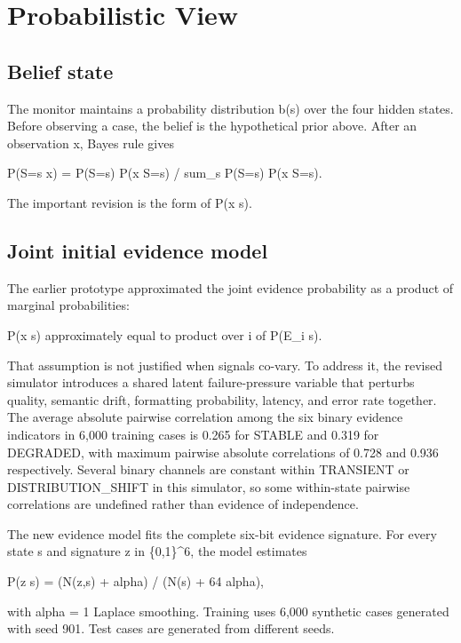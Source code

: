 \documentclass{article}
\begin{document}
\section{Probabilistic View}

\subsection{Belief state}

The monitor maintains a probability distribution b(s) over the four hidden states. Before observing a case, the belief is the hypothetical prior above. After an observation x, Bayes\textquotesingle{} rule gives

P(S=s \textbar{} x) = P(S=s) P(x \textbar{} S=s) / sum\_s\textquotesingle{} P(S=s\textquotesingle) P(x \textbar{} S=s\textquotesingle).

The important revision is the form of P(x \textbar{} s).

\subsection{Joint initial evidence model}

The earlier prototype approximated the joint evidence probability as a product of marginal probabilities:

P(x \textbar{} s) approximately equal to product over i of P(E\_i \textbar{} s).

That assumption is not justified when signals co-vary. To address it, the revised simulator introduces a shared latent failure-pressure variable that perturbs quality, semantic drift, formatting probability, latency, and error rate together. The average absolute pairwise correlation among the six binary evidence indicators in 6,000 training cases is 0.265 for STABLE and 0.319 for DEGRADED, with maximum pairwise absolute correlations of 0.728 and 0.936 respectively. Several binary channels are constant within TRANSIENT or DISTRIBUTION\_SHIFT in this simulator, so some within-state pairwise correlations are undefined rather than evidence of independence.

The new evidence model fits the complete six-bit evidence signature. For every state s and signature z in \{0,1\}\^{}6, the model estimates

P(z \textbar{} s) = (N(z,s) + alpha) / (N(s) + 64 alpha),

with alpha = 1 Laplace smoothing. Training uses 6,000 synthetic cases generated with seed 901. Test cases are generated from different seeds.
\end{document}
